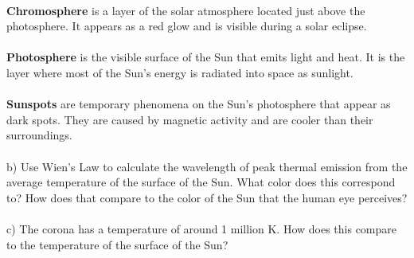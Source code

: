 \\
\textbf{Chromosphere} is a layer of the solar atmosphere located just above the photosphere. It appears as
a red glow and is visible during a solar eclipse.\\
\\
\textbf{Photosphere} is the visible surface of the Sun that emits light and heat. It is the layer where 
most of the Sun's energy is radiated into space as sunlight.\\
\\
\textbf{Sunspots} are temporary phenomena on the Sun's photosphere that appear as dark spots. They are 
caused by magnetic activity and are cooler than their surroundings.\\
\\
b) Use Wien's Law to calculate the wavelength of peak thermal emission from the average temperature of the
surface of the Sun. What color does this correspond to? How does that compare to the color of the Sun that
the human eye perceives?\\
\\
c) The corona has a temperature of around 1 million K. How does this compare to the temperature of the
surface of the Sun?\\
\\

